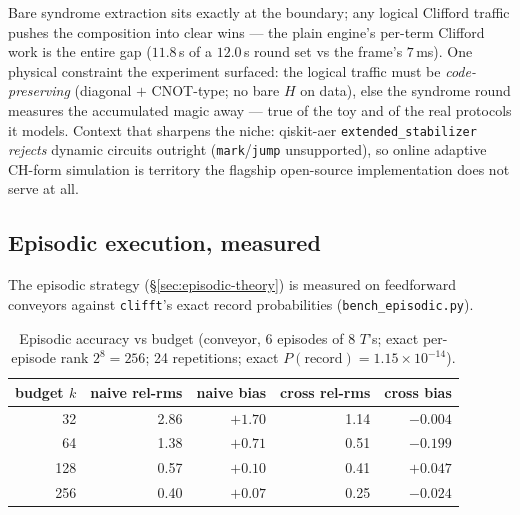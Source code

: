 \documentclass[11pt]{article}
\begin{document}
Bare syndrome extraction sits exactly at the boundary; any logical Clifford
traffic pushes the composition into clear wins --- the plain engine's
per-term Clifford work is the entire gap ($11.8$\,s of a $12.0$\,s round set
vs the frame's $7$\,ms). One physical constraint the experiment surfaced: the
logical traffic must be \emph{code-preserving} (diagonal $+$ CNOT-type; no
bare $H$ on data), else the syndrome round measures the accumulated magic
away --- true of the toy and of the real protocols it models. Context that
sharpens the niche: qiskit-aer \texttt{extended\_stabilizer} \emph{rejects}
dynamic circuits outright (\texttt{mark}/\texttt{jump} unsupported), so
online adaptive CH-form simulation is territory the flagship open-source
implementation does not serve at all.

\subsection{Episodic execution, measured}\label{sec:episodic}
The episodic strategy (\S\ref{sec:episodic-theory}) is measured on
feedforward conveyors against \texttt{clifft}'s exact record probabilities
(\texttt{bench\_episodic.py}).

\begin{table}[h]\centering
\caption{Episodic accuracy vs budget (conveyor, 6 episodes of 8 $T$'s; exact
per-episode rank $2^8{=}256$; 24 repetitions; exact
$P(\mathrm{record})=1.15\times10^{-14}$).}\label{tab:episodic}
\begin{tabular}{rrrrr}
\toprule
budget $k$ & naive rel-rms & naive bias & cross rel-rms & cross bias \\
\midrule
32  & 2.86 & $+1.70$ & 1.14 & $-0.004$ \\
64  & 1.38 & $+0.71$ & 0.51 & $-0.199$ \\
128 & 0.57 & $+0.10$ & 0.41 & $+0.047$ \\
256 & 0.40 & $+0.07$ & 0.25 & $-0.024$ \\
\bottomrule
\end{tabular}
\end{table}
\end{document}
